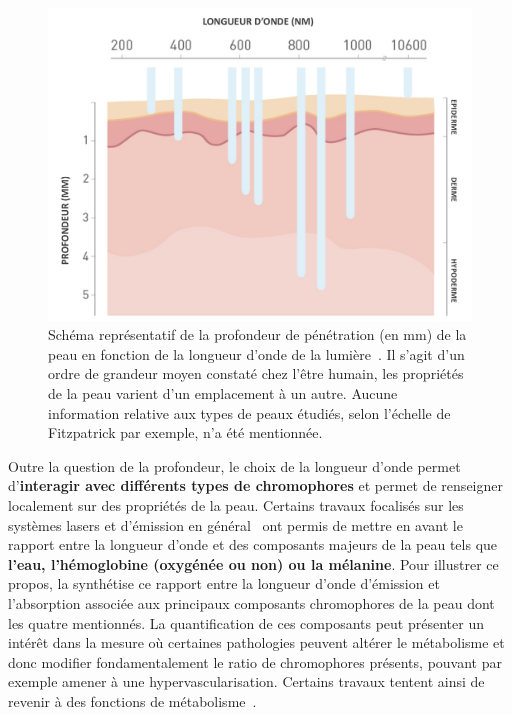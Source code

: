 \begin{figure}[H]
    \centering
    \includegraphics[width=0.95\linewidth]{contents/chapter_2/resources/scheme_light_penatrating.pdf}
    \caption{Schéma représentatif de la profondeur de pénétration (en mm) de la peau en fonction de la longueur d’onde de la lumière~\cite{Barolet2008}. Il s'agit d'un ordre de grandeur moyen constaté chez l'être humain, les propriétés de la peau varient d'un emplacement à un autre. Aucune information relative aux types de peaux étudiés, selon l'échelle de Fitzpatrick par exemple, n'a été mentionnée.}
    \label{fig:scheme_light_penatrating}
\end{figure}\par

Outre la question de la profondeur, le choix de la longueur d'onde permet d'\textbf{interagir avec différents types de chromophores} et permet de renseigner localement sur des propriétés de la peau. Certains travaux focalisés sur les systèmes lasers et d'émission en général~\cite{Stewart2013} ont permis de mettre en avant le rapport entre la longueur d'onde et des composants majeurs de la peau tels que \textbf{l'eau, l'hémoglobine (oxygénée ou non) ou la mélanine}. Pour illustrer ce propos, la  synthétise ce rapport entre la longueur d'onde d'émission et l'absorption associée aux principaux composants chromophores de la peau dont les quatre mentionnés. La quantification de ces composants peut présenter un intérêt dans la mesure où certaines pathologies peuvent altérer le métabolisme et donc modifier fondamentalement le ratio de chromophores présents, pouvant par exemple amener à une hypervascularisation. Certains travaux tentent ainsi de revenir à des fonctions de métabolisme~\cite{Im2016}.\par

